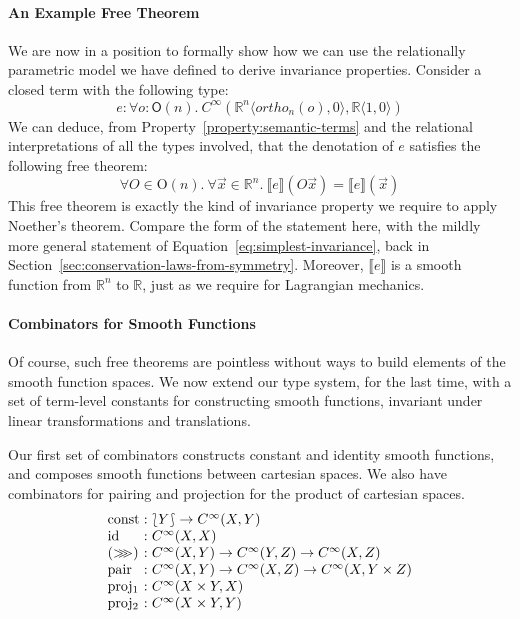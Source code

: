 \documentclass{sigplanconf}
\newcommand{\comp}{\mathrel{>\kern-0.45em>\kern-0.45em>}}
\newcommand{\typeOfCartSp}[1]{\lbag #1 \rbag}
\theoremstyle{examplestyle}
\newcommand{\sem}[1]{\llbracket #1 \rrbracket}
\begin{document}
\paragraph{An Example Free Theorem} We are now in a position to
formally show how we can use the relationally parametric model we have
defined to derive invariance properties. Consider a closed term with
the following type:
\begin{displaymath}
  e : \forall o : \mathsf{O}(n).~C^\infty(\mathbb{R}^n\langle \mathit{ortho}_n(o), 0 \rangle, \mathbb{R}\langle 1, 0 \rangle)
\end{displaymath}
We can deduce, from Property~\ref{property:semantic-terms} and the
relational interpretations of all the types involved, that the
denotation of $e$ satisfies the following free theorem:
\begin{displaymath}
  \forall O \in \mathrm{O}(n).~\forall \vec{x} \in \mathbb{R}^n.~\sem{e}(O\vec{x}) = \sem{e}(\vec{x})
\end{displaymath}
This free theorem is exactly the kind of invariance property we
require to apply Noether's theorem. Compare the form of the statement
here, with the mildly more general statement of
Equation~\ref{eq:simplest-invariance}, back in
Section~\ref{sec:conservation-laws-from-symmetry}. Moreover, $\sem{e}$
is a smooth function from $\mathbb{R}^n$ to $\mathbb{R}$, just as we
require for Lagrangian mechanics.

\paragraph{Combinators for Smooth Functions} Of course, such free
theorems are pointless without ways to build elements of the smooth
function spaces. We now extend our type system, for the last time,
with a set of term-level constants for constructing smooth functions,
invariant under linear transformations and translations.

Our first set of combinators constructs constant and identity smooth
functions, and composes smooth functions between cartesian spaces. We
also have combinators for pairing and projection for the product of
cartesian spaces.
\begin{displaymath}
  \begin{array}{l@{\hspace{0.3em}}c@{\hspace{0.3em}}l}
    \mathrm{const} &:& \typeOfCartSp{Y} \to C^\infty(X, Y) \\
    \mathrm{id} &:& C^\infty(X,X) \\
    (\comp) &:& C^\infty(X,Y) \to C^\infty(Y,Z) \to C^\infty(X,Z) \\
    \mathrm{pair} &:& C^\infty(X,Y) \to C^\infty(X,Z) \to C^\infty(X, Y \times Z) \\
    \mathrm{proj_1}&:& C^\infty(X \times Y, X) \\
    \mathrm{proj_2}&:& C^\infty(X \times Y, Y) \\
  \end{array}
\end{displaymath}
\end{document}
